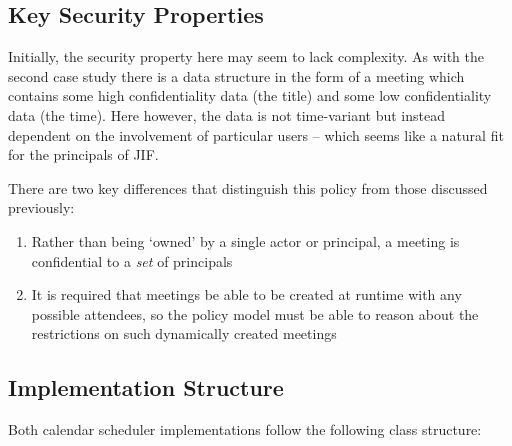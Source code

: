 \subsection{Key Security Properties}

Initially, the security property here may seem to lack complexity. As with the second case study there is a data structure in the form of a meeting which contains some high confidentiality data (the title) and some low confidentiality data (the time). Here however, the data is not time-variant but instead dependent on the involvement of particular users -- which seems like a natural fit for the principals of JIF.

There are two key differences that distinguish this policy from those discussed previously:

\begin{enumerate}
	
	\item Rather than being `owned' by a single actor or principal, a meeting is confidential to a \textit{set} of principals
	
	\item It is required that meetings be able to be created at runtime with any possible attendees, so the policy model must be able to reason about the restrictions on such dynamically created meetings
	
\end{enumerate}

\newpage

\subsection{Implementation Structure}

Both calendar scheduler implementations follow the following class structure:

